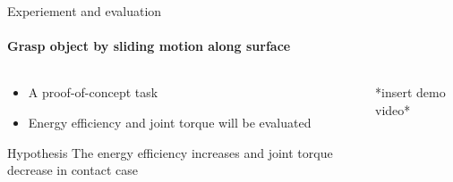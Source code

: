 \documentclass[aspectratio=169]{beamer}
\begin{document}
  \begin{frame}{Experiement and evaluation}
    \framesubtitle{Grasp object by sliding motion along surface}
    \begin{columns}[c]
      \begin{column}{.5\textwidth}
        \begin{itemize}
          \item A proof-of-concept task
          \item Energy efficiency and joint torque will be evaluated
        \end{itemize}     
        \centering
        \begin{block}{Hypothesis}
          The energy efficiency increases and 
          joint torque decrease in contact case
        \end{block}

      \end{column}
      \begin{column}{.5\textwidth}
        \centering
        *insert demo video*
      \end{column}
      \end{columns}
  \end{frame}
\end{document}
